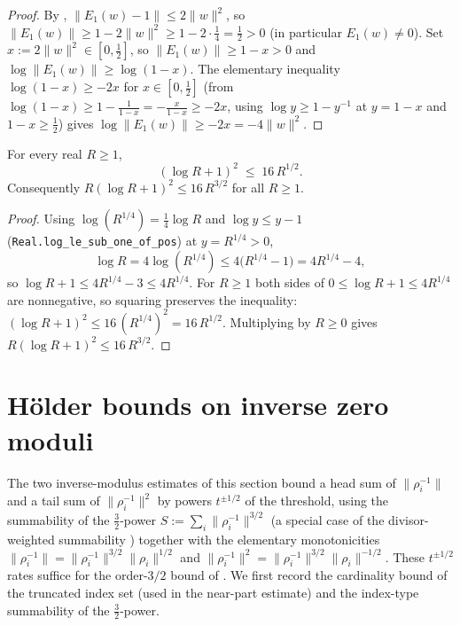 \begin{proof}
\leanok
{}
By , $\|E_1(w)-1\|\le2\|w\|^{2}$, so
$\|E_1(w)\|\ge1-2\|w\|^{2}\ge1-2\cdot\tfrac14=\tfrac12>0$ (in particular $E_1(w)\neq0$).
Set $x:=2\|w\|^{2}\in[0,\tfrac12]$, so $\|E_1(w)\|\ge1-x>0$ and
$\log\|E_1(w)\|\ge\log(1-x)$. The elementary inequality $\log(1-x)\ge-2x$ for
$x\in[0,\tfrac12]$ (from $\log(1-x)\ge1-\tfrac1{1-x}=-\tfrac{x}{1-x}\ge-2x$, using
$\log y\ge1-y^{-1}$ at $y=1-x$ and $1-x\ge\tfrac12$) gives
$\log\|E_1(w)\|\ge-2x=-4\|w\|^{2}$.
\end{proof}

\begin{lemma}
\label{lem:cm_logsq_le}
\leanok
For every real $R\ge1$,
\[
  (\log R+1)^{2}\;\le\;16\,R^{1/2}.
\]
Consequently $R(\log R+1)^{2}\le16\,R^{3/2}$ for all $R\ge1$.
\end{lemma}

\begin{proof}
\leanok
Using $\log(R^{1/4})=\tfrac14\log R$ and $\log y\le y-1$
(\texttt{Real.log\_le\_sub\_one\_of\_pos}) at $y=R^{1/4}>0$,
\[
  \log R=4\log(R^{1/4})\le4\bigl(R^{1/4}-1\bigr)=4R^{1/4}-4,
\]
so $\log R+1\le4R^{1/4}-3\le4R^{1/4}$. For $R\ge1$ both sides of $0\le\log R+1\le4R^{1/4}$ are
nonnegative, so squaring preserves the inequality:
$(\log R+1)^{2}\le16\,(R^{1/4})^{2}=16\,R^{1/2}$. Multiplying by $R\ge0$ gives
$R(\log R+1)^{2}\le16\,R^{3/2}$.
\end{proof}

\section{Hölder bounds on inverse zero moduli}
\label{sec:cm_sums}

The two inverse-modulus estimates of this section bound a head sum of $\|\rho_i^{-1}\|$ and a
tail sum of $\|\rho_i^{-1}\|^{2}$ by powers $t^{\pm1/2}$ of the threshold, using the
summability of the $\tfrac32$-power $S:=\sum_i\|\rho_i^{-1}\|^{3/2}$ (a special case of
the divisor-weighted summability ) together with the elementary
monotonicities $\|\rho_i^{-1}\|=\|\rho_i^{-1}\|^{3/2}\|\rho_i\|^{1/2}$ and
$\|\rho_i^{-1}\|^{2}=\|\rho_i^{-1}\|^{3/2}\|\rho_i\|^{-1/2}$. These $t^{\pm1/2}$ rates
suffice for the order-$3/2$ bound of . We first record the cardinality bound of the truncated index
set (used in the near-part estimate) and the index-type summability of the $\tfrac32$-power.

